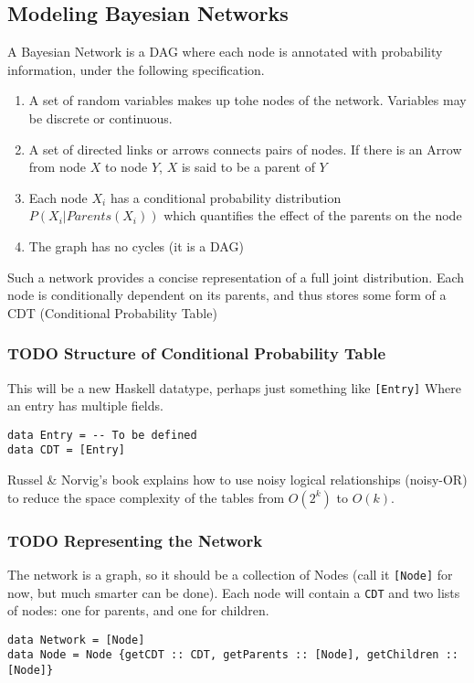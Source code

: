 \documentclass[11pt]{article}
\begin{document}
\subsection{Modeling Bayesian Networks}
\label{sec-2-2}

A Bayesian Network is a DAG where each node is annotated
with probability information, under the following specification.

\begin{enumerate}
\item A set of random variables makes up tohe nodes of the network. Variables
may be discrete or continuous.
\item A set of directed links or arrows connects pairs of nodes. If there is
an Arrow from node $X$ to node $Y$, $X$ is said to be a parent of $Y$
\item Each node $X_i$ has a conditional probability distribution
$P(X_i | Parents (X_i))$ which quantifies the effect of the
parents on the node
\item The graph has no cycles (it is a DAG)
\end{enumerate}

Such a network provides a concise representation of a full joint
distribution. Each node is conditionally dependent on its parents,
and thus stores some form of a CDT (Conditional Probability Table)

\subsubsection{{\bfseries\sffamily TODO} Structure of Conditional Probability Table}
\label{sec-2-2-1}
This will be a new Haskell datatype, perhaps just something like \texttt{[Entry]}
Where an entry has multiple fields.

\begin{center}
\texttt{data Entry = -{}- To be defined} \\
      \texttt{data CDT = [Entry]}
\end{center}

Russel \& Norvig's book explains how to use noisy logical
relationships (noisy-OR) to reduce the space complexity of the tables
from $O(2^k)$ to $O(k)$. 

\subsubsection{{\bfseries\sffamily TODO} Representing the Network}
\label{sec-2-2-2}
The network is a graph, so it should be a collection of Nodes
(call it \texttt{[Node]} for now, but much smarter can be done). Each
node will contain a \texttt{CDT} and two lists of nodes: one for
parents, and one for children.
\begin{center}
\texttt{data Network = [Node]} \\
      \texttt{data Node = Node \{getCDT :: CDT, getParents :: [Node], getChildren :: [Node]\}}
\end{center}
\end{document}
